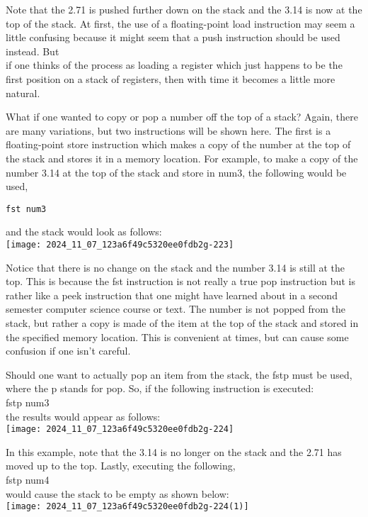 \documentclass[10pt]{article}
\begin{document}
Note that the 2.71 is pushed further down on the stack and the 3.14 is now at the top of the stack. At first, the use of a floating-point load instruction may seem a little confusing because it might seem that a push instruction should be used instead. But\\
if one thinks of the process as loading a register which just happens to be the first position on a stack of registers, then with time it becomes a little more natural.

What if one wanted to copy or pop a number off the top of a stack? Again, there are many variations, but two instructions will be shown here. The first is a floating-point store instruction which makes a copy of the number at the top of the stack and stores it in a memory location. For example, to make a copy of the number 3.14 at the top of the stack and store in num3, the following would be used,

\begin{verbatim}
fst num3
\end{verbatim}

and the stack would look as follows:\\
\texttt{[image: 2024\_11\_07\_123a6f49c5320ee0fdb2g-223]}

Notice that there is no change on the stack and the number 3.14 is still at the top. This is because the fst instruction is not really a true pop instruction but is rather like a peek instruction that one might have learned about in a second semester computer science course or text. The number is not popped from the stack, but rather a copy is made of the item at the top of the stack and stored in the specified memory location. This is convenient at times, but can cause some confusion if one isn't careful.

Should one want to actually pop an item from the stack, the fstp must be used, where the p stands for pop. So, if the following instruction is executed:\\
fstp num3\\
the results would appear as follows:\\
\texttt{[image: 2024\_11\_07\_123a6f49c5320ee0fdb2g-224]}

In this example, note that the 3.14 is no longer on the stack and the 2.71 has moved up to the top. Lastly, executing the following,\\
fstp num4\\
would cause the stack to be empty as shown below:\\
\texttt{[image: 2024\_11\_07\_123a6f49c5320ee0fdb2g-224(1)]}
\end{document}
